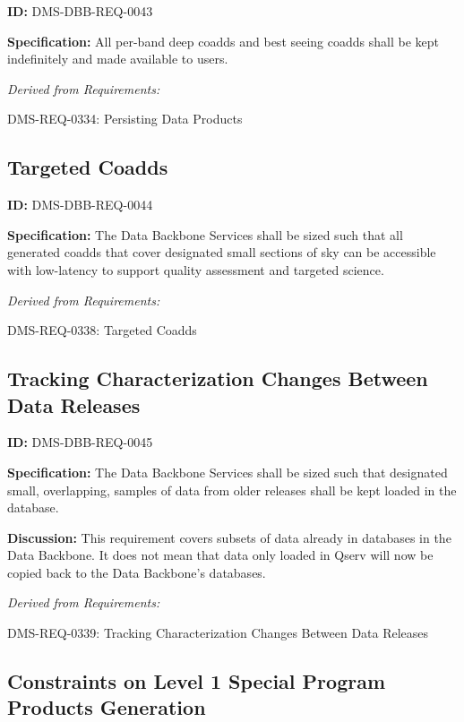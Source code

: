 \documentclass[SE,toc]{lsstdoc}
\begin{document}
\label{DMS-DBB-REQ-0043}
\textbf{ID:} DMS-DBB-REQ-0043

\textbf{Specification:}
All per-band deep coadds and best seeing coadds shall be kept indefinitely and made available to users.

\emph{Derived from Requirements:}

DMS-REQ-0334:
Persisting Data Products \newline

\subsection{Targeted Coadds}

\label{DMS-DBB-REQ-0044}
\textbf{ID:} DMS-DBB-REQ-0044

\textbf{Specification:}
The Data Backbone Services shall be sized such that all generated coadds that cover designated small sections of sky can be accessible with low-latency to support quality assessment and targeted science.

\emph{Derived from Requirements:}

DMS-REQ-0338:
Targeted Coadds \newline

\subsection{Tracking Characterization Changes Between Data Releases}

\label{DMS-DBB-REQ-0045}
\textbf{ID:} DMS-DBB-REQ-0045

\textbf{Specification:}
The Data Backbone Services shall be sized such that designated small, overlapping, samples of data from older releases shall be kept loaded in the database.

\textbf{Discussion:}
This requirement covers subsets of data already in databases in the Data Backbone.    It does not mean that data only loaded in Qserv will now be copied back to the Data Backbone's databases.

\emph{Derived from Requirements:}

DMS-REQ-0339:
Tracking Characterization Changes Between Data Releases \newline

\subsection{Constraints on Level 1 Special Program Products Generation}
\end{document}
